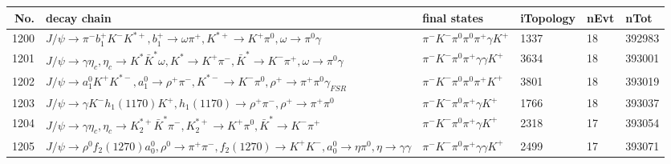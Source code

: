 \begin{table}[htbp] 
\begin{center}
\begin{small}
\begin{tabular}{rlllll}\hline\hline
 No. & decay chain & final states &  iTopology & nEvt & nTot \\\hline
1200&$J/\psi       \rightarrow \pi^{-}        b_{1}^{+}      K^{-}          K^{*+}         , b_{1}^{+}       \rightarrow \omega         \pi^{+}        , K^{*+}          \rightarrow K^{+}          \pi^{0}        , \omega          \rightarrow \pi^{0}        \gamma       $&$\pi^{-}        K^{-}          \pi^{0}        \pi^{0}        \pi^{+}        \gamma       K^{+}          $& 1337&   18&392983\\
1201&$J/\psi       \rightarrow \gamma       \eta_{c}    , \eta_{c}     \rightarrow K^{*}          \bar{K}^{*}   \omega         , K^{*}           \rightarrow K^{+}          \pi^{-}        , \bar{K}^{*}    \rightarrow K^{-}          \pi^{+}        , \omega          \rightarrow \pi^{0}        \gamma       $&$\pi^{-}        K^{-}          \pi^{0}        \pi^{+}        \gamma       \gamma       K^{+}          $& 3634&   18&393001\\
1202&$J/\psi       \rightarrow a_{1}^{0}      K^{+}          K^{*-}         , a_{1}^{0}       \rightarrow \rho^{+}      \pi^{-}        , K^{*-}          \rightarrow K^{-}          \pi^{0}        , \rho^{+}       \rightarrow \pi^{+}        \pi^{0}        \gamma_{FSR} $&$\pi^{-}        K^{-}          \pi^{0}        \pi^{0}        \pi^{+}        K^{+}          $& 3801&   18&393019\\
1203&$J/\psi       \rightarrow \gamma       K^{-}          h_{1}(1170)    K^{+}          , h_{1}(1170)     \rightarrow \rho^{+}      \pi^{-}        , \rho^{+}       \rightarrow \pi^{+}        \pi^{0}        $&$\pi^{-}        K^{-}          \pi^{0}        \pi^{+}        \gamma       K^{+}          $& 1766&   18&393037\\
1204&$J/\psi       \rightarrow \gamma       \eta_{c}    , \eta_{c}     \rightarrow K_2^{*+}       \bar{K}^{*}   \pi^{-}        , K_2^{*+}        \rightarrow K^{+}          \pi^{0}        , \bar{K}^{*}    \rightarrow K^{-}          \pi^{+}        $&$\pi^{-}        K^{-}          \pi^{0}        \pi^{+}        \gamma       K^{+}          $& 2318&   17&393054\\
1205&$J/\psi       \rightarrow \rho^{0}      f_{2}(1270)    a_{0}^{0}      , \rho^{0}       \rightarrow \pi^{+}        \pi^{-}        , f_{2}(1270)     \rightarrow K^{+}          K^{-}          , a_{0}^{0}       \rightarrow \eta          \pi^{0}        , \eta           \rightarrow \gamma       \gamma       $&$\pi^{-}        K^{-}          \pi^{0}        \pi^{+}        \gamma       \gamma       K^{+}          $& 2499&   17&393071\\

\end{tabular}
\end{small}
\end{center}
\end{table}
